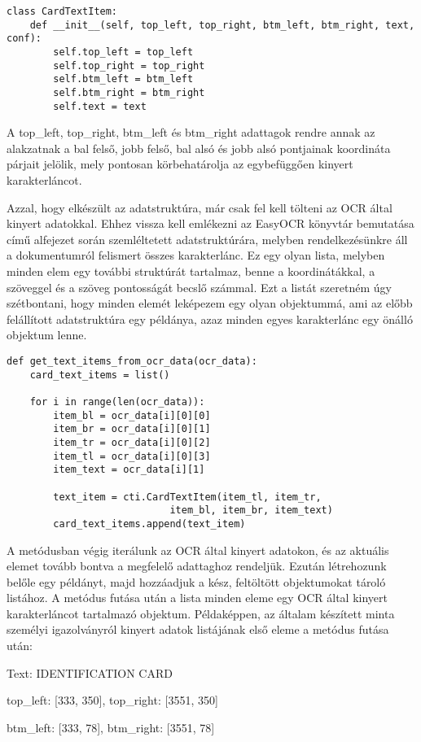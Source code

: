 \documentclass[12pt]{report}
\begin{document}
\begin{verbatim}
class CardTextItem:
    def __init__(self, top_left, top_right, btm_left, btm_right, text, conf):
        self.top_left = top_left
        self.top_right = top_right
        self.btm_left = btm_left
        self.btm_right = btm_right
        self.text = text
\end{verbatim}

A top\_left, top\_right, btm\_left és btm\_right adattagok rendre annak az alakzatnak a bal felső, jobb felső, bal alsó és jobb alsó pontjainak koordináta párjait jelölik, mely pontosan körbehatárolja az egybefüggően kinyert karakterláncot.

Azzal, hogy elkészült az adatstruktúra, már csak fel kell tölteni az OCR által kinyert adatokkal. Ehhez vissza kell emlékezni az EasyOCR könyvtár bemutatása című alfejezet során szemléltetett adatstruktúrára, melyben rendelkezésünkre áll a dokumentumról felismert összes karakterlánc. Ez egy olyan lista, melyben minden elem egy további struktúrát tartalmaz, benne a koordinátákkal, a szöveggel és a szöveg pontosságát becslő számmal. Ezt a listát szeretném úgy szétbontani, hogy minden elemét leképezem egy olyan objektummá, ami az előbb felállított adatstruktúra egy példánya, azaz minden egyes karakterlánc egy önálló objektum lenne.

\begin{verbatim}
def get_text_items_from_ocr_data(ocr_data):
    card_text_items = list()

    for i in range(len(ocr_data)):
        item_bl = ocr_data[i][0][0]
        item_br = ocr_data[i][0][1]
        item_tr = ocr_data[i][0][2]
        item_tl = ocr_data[i][0][3]
        item_text = ocr_data[i][1]

        text_item = cti.CardTextItem(item_tl, item_tr, 
                            item_bl, item_br, item_text)
        card_text_items.append(text_item)
\end{verbatim}

A metódusban végig iterálunk az OCR által kinyert adatokon, és az aktuális elemet tovább bontva a megfelelő adattaghoz rendeljük. Ezután létrehozunk belőle egy példányt, majd hozzáadjuk a kész, feltöltött objektumokat tároló listához. A metódus futása után a lista minden eleme egy OCR által kinyert karakterláncot tartalmazó objektum. Példaképpen, az általam készített minta személyi igazolványról kinyert adatok listájának első eleme a metódus futása után:

\begin{tcolorbox}
    Text: IDENTIFICATION CARD

    top\_left: [333, 350], top\_right: [3551, 350]

    btm\_left: [333, 78], btm\_right: [3551, 78]
\end{tcolorbox}
\end{document}
